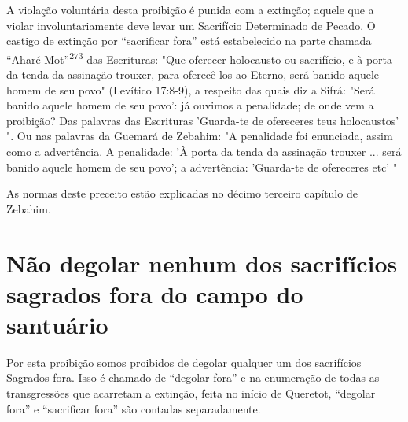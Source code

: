 A violação voluntária desta proibição é punida com a extinção; aquele
que a violar involuntariamente deve levar um Sacrifício Determinado de
Peca­do. O castigo de extinção por ``sacrificar fora'' está estabelecido
na parte cha­mada ``Aharé Mot''\textsuperscript{273} das Escrituras: "Que
oferecer holocausto ou sacrifício, e à porta da tenda da assinação
trouxer, para oferecê-los ao Eterno, será banido aquele homem de seu
povo" (Levítico 17:8-9), a respeito das quais diz a Sifrá: "Será banido
aquele homem de seu povo': já ouvimos a penalidade; de onde vem a
proibição? Das palavras das Escrituras 'Guarda-te de ofereceres teus
ho­locaustos' ". Ou nas palavras da Guemará de Zebahim: "A penalidade
foi enun­ciada, assim como a advertência. A penalidade: 'À porta da
tenda da assinação trouxer ... será banido aquele homem de seu povo'; a
advertência: 'Guarda-te de ofereceres etc' "

As normas deste preceito estão explicadas no décimo terceiro capí­tulo
de Zebahim.

\section{Não degolar nenhum dos sacrifícios sagrados fora do campo do santuário}

Por esta proibição somos proibidos de degolar qualquer um dos
sa­crifícios Sagrados fora. Isso é chamado de ``degolar fora'' e na
enumeração de todas as transgressões que acarretam a extinção, feita no
início de Queretot, ``degolar fora'' e ``sacrificar fora'' são contadas
separadamente.

